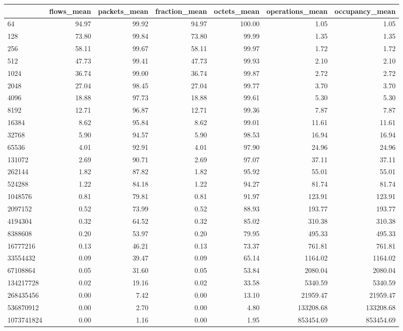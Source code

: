 \begin{tabular}{lrrrrrr}
\toprule
 & flows_mean & packets_mean & fraction_mean & octets_mean & operations_mean & occupancy_mean \\
\midrule
64 & 94.97 & 99.92 & 94.97 & 100.00 & 1.05 & 1.05 \\
128 & 73.80 & 99.84 & 73.80 & 99.99 & 1.35 & 1.35 \\
256 & 58.11 & 99.67 & 58.11 & 99.97 & 1.72 & 1.72 \\
512 & 47.73 & 99.41 & 47.73 & 99.93 & 2.10 & 2.10 \\
1024 & 36.74 & 99.00 & 36.74 & 99.87 & 2.72 & 2.72 \\
2048 & 27.04 & 98.45 & 27.04 & 99.77 & 3.70 & 3.70 \\
4096 & 18.88 & 97.73 & 18.88 & 99.61 & 5.30 & 5.30 \\
8192 & 12.71 & 96.87 & 12.71 & 99.36 & 7.87 & 7.87 \\
16384 & 8.62 & 95.84 & 8.62 & 99.01 & 11.61 & 11.61 \\
32768 & 5.90 & 94.57 & 5.90 & 98.53 & 16.94 & 16.94 \\
65536 & 4.01 & 92.91 & 4.01 & 97.90 & 24.96 & 24.96 \\
131072 & 2.69 & 90.71 & 2.69 & 97.07 & 37.11 & 37.11 \\
262144 & 1.82 & 87.82 & 1.82 & 95.92 & 55.01 & 55.01 \\
524288 & 1.22 & 84.18 & 1.22 & 94.27 & 81.74 & 81.74 \\
1048576 & 0.81 & 79.81 & 0.81 & 91.97 & 123.91 & 123.91 \\
2097152 & 0.52 & 73.99 & 0.52 & 88.93 & 193.77 & 193.77 \\
4194304 & 0.32 & 64.52 & 0.32 & 85.02 & 310.38 & 310.38 \\
8388608 & 0.20 & 53.97 & 0.20 & 79.95 & 495.33 & 495.33 \\
16777216 & 0.13 & 46.21 & 0.13 & 73.37 & 761.81 & 761.81 \\
33554432 & 0.09 & 39.47 & 0.09 & 65.14 & 1164.02 & 1164.02 \\
67108864 & 0.05 & 31.60 & 0.05 & 53.84 & 2080.04 & 2080.04 \\
134217728 & 0.02 & 19.16 & 0.02 & 33.58 & 5340.59 & 5340.59 \\
268435456 & 0.00 & 7.42 & 0.00 & 13.10 & 21959.47 & 21959.47 \\
536870912 & 0.00 & 2.70 & 0.00 & 4.80 & 133208.68 & 133208.68 \\
1073741824 & 0.00 & 1.16 & 0.00 & 1.95 & 853454.69 & 853454.69 \\
\bottomrule
\end{tabular}
